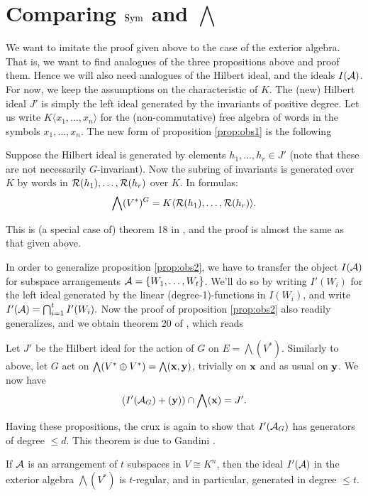 \documentclass[../main.tex]{subfiles}
\begin{document}
\section{Comparing $\operatorname{Sym}$ and $\bigwedge$}
We want to imitate the proof given above to the case of the exterior algebra.
That is, we want to find analogues of the three propositions above and
proof them. Hence we will also need analogues of the Hilbert ideal, and the 
ideals $I(\mathcal{A})$.
For now, we keep the assumptions on the characteristic of $K$.
The (new) Hilbert ideal $J'$ is simply the left ideal generated by the
invariants of positive degree.
Let us write $K\langle x_1, \dots, x_n \rangle$ for the (non-commutative) free
algebra of words in the symbols $x_1, \dots, x_n$. 
The new form of proposition \ref{prop:obs1} is the following
\begin{prop}\label{prop:newobs1}
    Suppose the Hilbert ideal is generated by elements $h_1, \dots, h_r \in J'$ 
    (note that these are not necessarily $G$-invariant). Now the subring of invariants
    is generated over $K$ by words in $\mathcal{R}(h_1), \dots, \mathcal{R}(h_r)$ over $K$. In
    formulas:
    \begin{equation*}
        \bigwedge(V^*)^G = K\langle\mathcal{R}(h_1), \dots, \mathcal{R}(h_r)\rangle.
    \end{equation*}
\end{prop}
This is (a special case of) theorem 18 in \cite{gandini2021degree}, and the proof
is almost the same as that given above.

In order to generalize proposition \ref{prop:obs2}, we have to transfer 
the object $I(\mathcal{A})$ for subspace arrangements $\mathcal{A} = \{W_1, \dots, W_t\}$. We'll 
do so by writing $I'(W_i)$ for the left ideal generated by the linear
(degree-1)-functions in $I(W_i)$, and write $I'(\mathcal{A}) = \bigcap_{i = 1}^t
I'(W_i).$ Now the proof of proposition \ref{prop:obs2} also readily
generalizes, and we obtain theorem 20 of \cite{gandini2021degree}, which reads
\begin{prop}
    Let $J'$ be the Hilbert ideal for the action of $G$ on $E = \bigwedge(V^*)$.
    Similarly to above, let $G$ act on $\bigwedge(V^* \oplus V^*) =
    \bigwedge(\mathbf{x}, \mathbf{y})$, trivially on $\mathbf{x}$ and as usual on $\mathbf{y}$. We now have
    \begin{equation*}
        (I'(\mathcal{A}_G) + (\mathbf{y})) \cap \bigwedge(\mathbf{x}) = J'.
    \end{equation*}
\end{prop}

Having these propositions, the crux is again to show that $I'(\mathcal{A}_G)$ has
generators of degree $\leq d$. This theorem is due to Gandini \cite[Theorem 9]{gandini2021degree}.
\begin{thm}\label{thm:newcrux}
    If $\mathcal{A}$ is an arrangement of $t$ subspaces in $V \cong K^n$, then the
    ideal $I'(\mathcal{A})$ in the exterior algebra $\bigwedge(V^*)$ is $t$-regular,
    and in particular, generated in degree $\leq t$. 
\end{thm}
\end{document}

